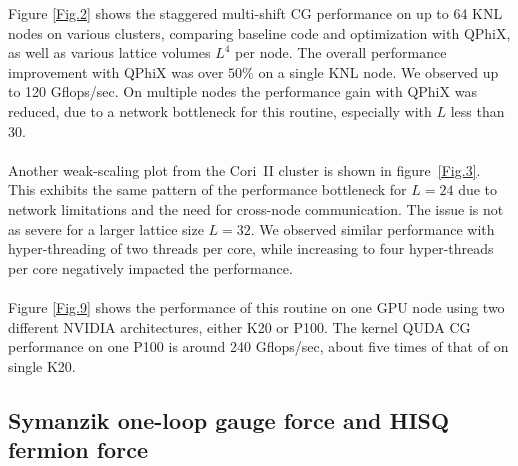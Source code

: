 \documentclass[epj]{webofc}
\begin{document}
\noindent{}Figure \ref{Fig.2} shows the staggered multi-shift CG performance on up to 64 KNL nodes on various clusters, 
comparing baseline code and optimization with QPhiX, 
as well as various lattice volumes $L^4$ per node.
The overall performance improvement with QPhiX was over $50\%$ on a single KNL node. 
We observed up to 120 Gflops/sec. 
On multiple nodes the performance gain with QPhiX was reduced, 
due to a network bottleneck for this routine, 
especially with $L$ less than $30$. \\
\\
Another weak-scaling plot from the Cori~II cluster is shown 
in figure~\ref{Fig.3}. 
This exhibits the same pattern of the performance bottleneck for $L = 24$ 
due to network limitations and the need for cross-node communication. 
The issue is not as severe for a larger lattice size  $L = 32$. %
We observed similar performance with hyper-threading of two threads per core, %
while increasing to four hyper-threads per core negatively impacted the performance. \\
\\
Figure \ref{Fig.9} shows the performance of this routine on one GPU node using
two different NVIDIA architectures, either K20 or P100. 
The kernel QUDA CG performance on one P100 is around 240 Gflops/sec, about five times of that of on single K20. 




\subsection{Symanzik one-loop gauge force and HISQ fermion force}\label{sec-2}
\end{document}

